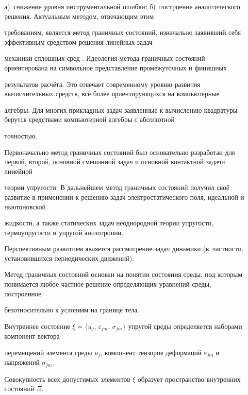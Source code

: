 а)~снижение уровня инструментальной ошибки; б)~построение аналитического решения. Актуальным методом, отвечающим этим

требованиям, является метод граничных состояний, изначально заявивший себя эффективным средством решения линейных задач

механики сплошных сред \cite{penkov:PVV}. Идеология метода граничных состояний ориентирована на символьное представление промежуточных и финишных

результатов расчёта. Это отвечает современному уровню развития вычислительных средств, всё более ориентирующихся на компьютерные

алгебры. Для многих прикладных задач заявленные к вычислению квадратуры берутся средствами компьютерной алгебры с абсолютной

точностью.



Первоначально метод граничных состояний был основательно разработан для первой, второй, основной смешанной задач и основной контактной задачи линейной

теории упругости. В дальнейшем метод граничных состояний получил своё развитие в применении к решению задач электростатического поля, идеальной и ньютоновской

жидкости, а также статических задач неоднородной теории упругости, термоупругости и упругой анизотропии. 

Перспективным развитием является рассмотрение задач динамики (в~частности, установившихся периодических движений).



Метод граничных состояний  основан на понятии состояния среды, под которым понимается любое частное решение определяющих уравнений среды, построенное

безотносительно к условиям на границе тела.



Внутреннее состояние $\xi=\{u_{j},\,\varepsilon_{jm},\,\sigma _{jm}\}$ упругой среды определяется наборами компонент вектора

перемещений элемента среды $u _{j}$, компонент тензоров деформаций $\varepsilon _{jm}$  и напряжений $\sigma _{jm}$. 

Совокупность всех допустимых элементов $\xi$ образует пространство внутренних состояний $\Xi$.






\pagebreak



